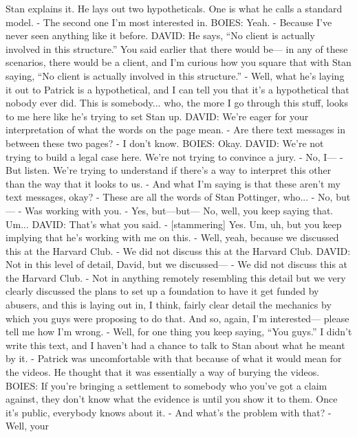 \begin{itemize}
\begin{itemize}
    Stan explains it. He lays out two hypotheticals. One is what he
    calls a standard model. - The second one I'm most interested in.
    BOIES: Yeah. - Because I've never seen anything like it before.
    DAVID: He says, ``No client is actually involved in this
    structure.'' You said earlier that there would be--- in any of these
    scenarios, there would be a client, and I'm curious how you square
    that with Stan saying, ``No client is actually involved in this
    structure.'' - Well, what he's laying it out to Patrick is a
    hypothetical, and I can tell you that it's a hypothetical that
    nobody ever did. This is somebody... who, the more I go through this
    stuff, looks to me here like he's trying to set Stan up. DAVID:
    We're eager for your interpretation of what the words on the page
    mean. - Are there text messages in between these two pages? - I
    don't know. BOIES: Okay. DAVID: We're not trying to build a legal
    case here. We're not trying to convince a jury. - No, I--- - But
    listen. We're trying to understand if there's a way to interpret
    this other than the way that it looks to us. - And what I'm saying
    is that these aren't my text messages, okay? - These are all the
    words of Stan Pottinger, who... - No, but--- - Was working with you.
    - Yes, but---but--- No, well, you keep saying that. Um... DAVID:
    That's what you said. - {[}stammering{]} Yes. Um, uh, but you keep
    implying that he's working with me on this. - Well, yeah, because we
    discussed this at the Harvard Club. - We did not discuss this at the
    Harvard Club. DAVID: Not in this level of detail, David, but we
    discussed--- - We did not discuss this at the Harvard Club. - Not in
    anything remotely resembling this detail but we very clearly
    discussed the plans to set up a foundation to have it get funded by
    abusers, and this is laying out in, I think, fairly clear detail the
    mechanics by which you guys were proposing to do that. And so,
    again, I'm interested--- please tell me how I'm wrong. - Well, for
    one thing you keep saying, ``You guys.'' I didn't write this text,
    and I haven't had a chance to talk to Stan about what he meant by
    it. - Patrick was uncomfortable with that because of what it would
    mean for the videos. He thought that it was essentially a way of
    burying the videos. BOIES: If you're bringing a settlement to
    somebody who you've got a claim against, they don't know what the
    evidence is until you show it to them. Once it's public, everybody
    knows about it. - And what's the problem with that? - Well, your

\end{itemize}
\end{itemize}
